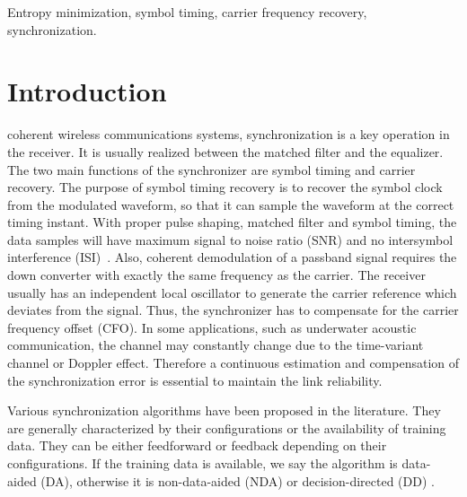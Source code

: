 \documentclass[journal,comsoc]{IEEEtran}
\begin{document}
\begin{IEEEkeywords}
Entropy minimization, symbol timing, carrier frequency recovery, synchronization.
\end{IEEEkeywords}

\IEEEpeerreviewmaketitle

\section{Introduction}
\label{sec:intro}
 coherent wireless communications systems, synchronization is a key operation in the receiver.
It is usually realized between the matched filter and the equalizer.
The two main functions of the synchronizer are symbol timing and carrier recovery.
The purpose of symbol timing recovery is to recover the symbol clock from the modulated waveform, so that it can sample the waveform at the correct timing instant.
With proper pulse shaping, matched filter and symbol timing, the data samples will have maximum signal to noise ratio (SNR) and no intersymbol interference (ISI)~\cite{mengali1997synchronization}.
Also, coherent demodulation of a passband signal requires the down converter with exactly the same frequency as the carrier. 
The receiver usually has an independent local oscillator to generate the carrier reference which deviates from the signal.  
Thus, the synchronizer has to compensate for the carrier frequency offset (CFO). 
In some applications, such as underwater acoustic communication, the channel may constantly change due to the time-variant channel or Doppler effect. 
Therefore a continuous estimation and compensation of the synchronization error is essential to maintain the link reliability.

Various synchronization algorithms have been proposed in the literature.
They are generally characterized by their configurations or the availability of training data.
They can be either feedforward or feedback depending on their configurations.
If the training data is available, we say the algorithm is data-aided (DA), otherwise it is non-data-aided (NDA) or decision-directed (DD) \cite{mengali1997synchronization}.
\end{document}
